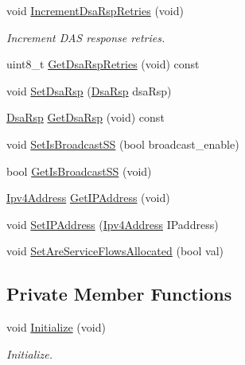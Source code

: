 \begin{DoxyCompactItemize}
void \hyperlink{classns3_1_1SSRecord_a76ff41d0ed227b65896d7924c3d911d7}{Increment\+Dsa\+Rsp\+Retries} (void)
\begin{DoxyCompactList}\small\item\em Increment D\+AS response retries. \end{DoxyCompactList}\item 
uint8\+\_\+t \hyperlink{classns3_1_1SSRecord_a2d39bd5690b7df1f0c14df46a04f1cfa}{Get\+Dsa\+Rsp\+Retries} (void) const 
\item 
void \hyperlink{classns3_1_1SSRecord_a41cae3dc0f0009c8f051bf0176a716a0}{Set\+Dsa\+Rsp} (\hyperlink{classns3_1_1DsaRsp}{Dsa\+Rsp} dsa\+Rsp)
\item 
\hyperlink{classns3_1_1DsaRsp}{Dsa\+Rsp} \hyperlink{classns3_1_1SSRecord_a789814403b1eafd6c63661556fccff27}{Get\+Dsa\+Rsp} (void) const 
\item 
void \hyperlink{classns3_1_1SSRecord_a55371a9db7194024aa7076dbc1794997}{Set\+Is\+Broadcast\+SS} (bool broadcast\+\_\+enable)
\item 
bool \hyperlink{classns3_1_1SSRecord_abb3e13846f0230034a9612c160d20d9f}{Get\+Is\+Broadcast\+SS} (void)
\item 
\hyperlink{classns3_1_1Ipv4Address}{Ipv4\+Address} \hyperlink{classns3_1_1SSRecord_a30c76badd72033b3f72565464ae2c14c}{Get\+I\+P\+Address} (void)
\item 
void \hyperlink{classns3_1_1SSRecord_aaa9786cb866d6faa4e73ec148eab1d81}{Set\+I\+P\+Address} (\hyperlink{classns3_1_1Ipv4Address}{Ipv4\+Address} I\+Paddress)
\item 
void \hyperlink{classns3_1_1SSRecord_ac0002cc198a34bf50fc00c1544c9c12c}{Set\+Are\+Service\+Flows\+Allocated} (bool val)
\end{DoxyCompactItemize}
\subsection*{Private Member Functions}
\begin{DoxyCompactItemize}
\item 
void \hyperlink{classns3_1_1SSRecord_a979ad7a0f79eee5647f8c193dc258c6a}{Initialize} (void)
\begin{DoxyCompactList}\small\item\em Initialize. \end{DoxyCompactList}\end{DoxyCompactItemize}
